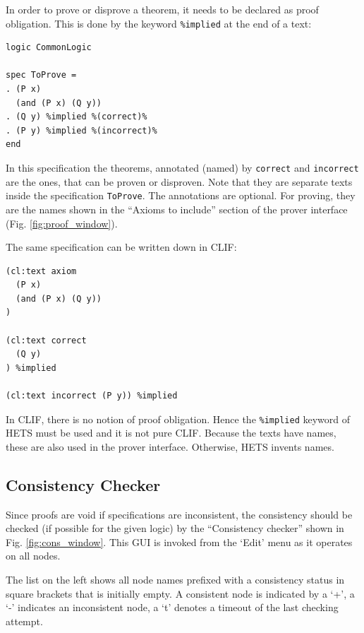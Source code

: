 \documentclass{article}
\newcommand{\normalTEXTSC}[2]{{#1\scriptsize#2}}
\newcommand     {\Hets}{\normalTEXTSC{H}{ETS}\xspace}
\begin{document}
In order to prove or disprove a theorem, it needs to be declared as proof 
obligation. This is done by the keyword \texttt{\%implied} at the end of a text:

\begin{lstlisting}
logic CommonLogic

spec ToProve =
. (P x)
  (and (P x) (Q y))
. (Q y) %implied %(correct)%
. (P y) %implied %(incorrect)%
end
\end{lstlisting}

In this specification the theorems, annotated (named) by \texttt{correct} and 
\texttt{incorrect} are the ones, that can be proven or disproven.
Note that they are separate texts inside the specification \texttt{ToProve}.
The annotations are optional. For proving, they are the names shown in the 
``Axioms to include'' section of the prover interface 
(Fig. \ref{fig:proof_window}).

The same specification can be written down in CLIF:
\begin{lstlisting}[language=clif]
(cl:text axiom
  (P x)
  (and (P x) (Q y))
)

(cl:text correct
  (Q y)
) %implied

(cl:text incorrect (P y)) %implied
\end{lstlisting}
In CLIF, there is no notion of proof obligation. Hence the \texttt{\%implied} 
keyword of \Hets must be used and it is not pure CLIF. Because the texts have 
names, these are also used in the prover interface. Otherwise, \Hets invents 
names.

\subsection{Consistency Checker}
\label{sec:CC}
Since proofs are void if specifications are inconsistent, the consistency
should be checked (if possible for the given logic) by the ``Consistency
checker'' shown in Fig. \ref{fig:cons_window}.  This GUI is invoked from
the `Edit' menu as it operates on all nodes.

The list on the left shows all node names prefixed with a consistency status
in square brackets that is initially empty.  A consistent node is indicated by
a `+', a `-' indicates an inconsistent node, a `t' denotes a timeout of the last
checking attempt.
\end{document}
